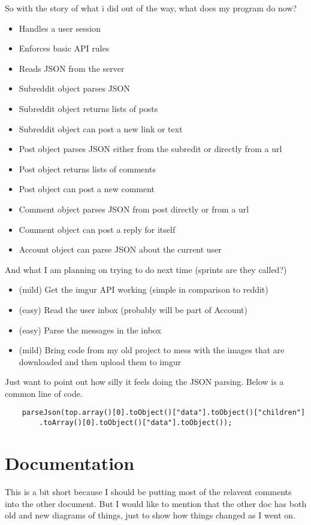 \documentclass[12pt]{article}
\begin{document}
So with the story of what i did out of the way, what does my program do now?
\begin{itemize}
	\item Handles a user session
	\item Enforces basic API rules
	\item Reads JSON from the server
	\item Subreddit object parses JSON
	\item Subreddit object returns lists of posts
	\item Subreddit object can post a new link or text
	\item Post object parses JSON either from the subredit or directly from a url
	\item Post object returns lists of comments
	\item Post object can post a new comment
	\item Comment object parses JSON from post directly or from a url
	\item Comment object can post a reply for itself
	\item Account object can parse JSON about the current user
\end{itemize}

And what I am planning on trying to do next time (sprints are they called?)
\begin{itemize}
	\item (mild) Get the imgur API working (simple in comparison to reddit)
	\item (easy) Read the user inbox (probably will be part of Account)
	\item (easy) Parse the messages in the inbox
	\item (mild) Bring code from my old project to mess with the images that are downloaded and then upload them to imgur
\end{itemize}

Just want to point out how silly it feels doing the JSON parsing.
Below is a common line of code.
\begin{verbatim}
	parseJson(top.array()[0].toObject()["data"].toObject()["children"]
		.toArray()[0].toObject()["data"].toObject());
\end{verbatim}

\section{Documentation}

This is a bit short because I should be putting most of the relavent comments into the other document.
But I would like to mention that the other doc has both old and new diagrams of things, just to show how things changed as I went on.
\end{document}
